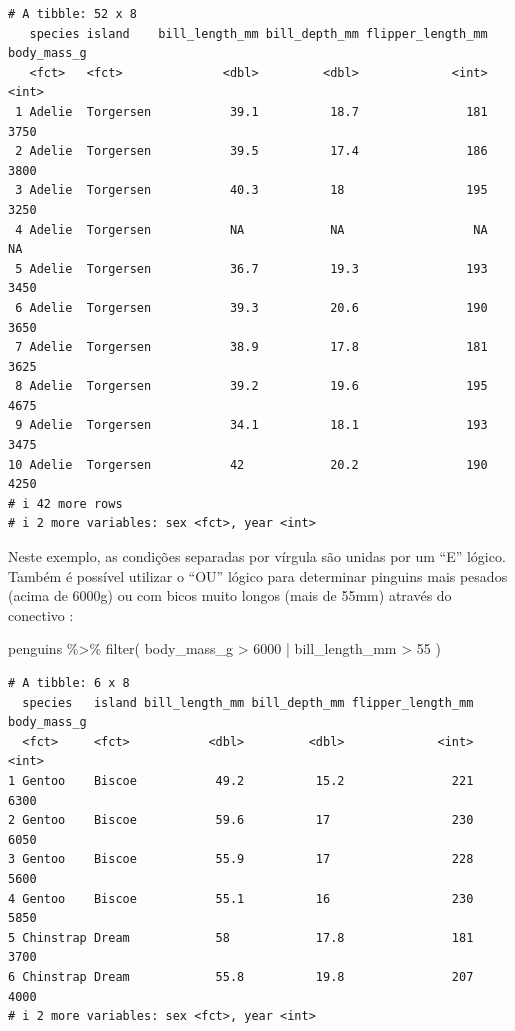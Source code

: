 \documentclass[
  12pt,
  letterpaper,
  DIV=11,
  numbers=noendperiod]{scrreprt}
\newenvironment{Shaded}{\begin{snugshade}}{\end{snugshade}}
\newcommand{\DecValTok}[1]{\textcolor[rgb]{0.68,0.00,0.00}{#1}}
\newcommand{\FunctionTok}[1]{\textcolor[rgb]{0.28,0.35,0.67}{#1}}
\newcommand{\NormalTok}[1]{\textcolor[rgb]{0.00,0.23,0.31}{#1}}
\newcommand{\SpecialCharTok}[1]{\textcolor[rgb]{0.37,0.37,0.37}{#1}}
\theoremstyle{definition}
\theoremstyle{exemplo}
\begin{document}
\begin{verbatim}
# A tibble: 52 x 8
   species island    bill_length_mm bill_depth_mm flipper_length_mm body_mass_g
   <fct>   <fct>              <dbl>         <dbl>             <int>       <int>
 1 Adelie  Torgersen           39.1          18.7               181        3750
 2 Adelie  Torgersen           39.5          17.4               186        3800
 3 Adelie  Torgersen           40.3          18                 195        3250
 4 Adelie  Torgersen           NA            NA                  NA          NA
 5 Adelie  Torgersen           36.7          19.3               193        3450
 6 Adelie  Torgersen           39.3          20.6               190        3650
 7 Adelie  Torgersen           38.9          17.8               181        3625
 8 Adelie  Torgersen           39.2          19.6               195        4675
 9 Adelie  Torgersen           34.1          18.1               193        3475
10 Adelie  Torgersen           42            20.2               190        4250
# i 42 more rows
# i 2 more variables: sex <fct>, year <int>
\end{verbatim}

Neste exemplo, as condições separadas por vírgula são unidas por um
``E'' lógico. Também é possível utilizar o ``OU'' lógico para determinar
pinguins mais pesados (acima de 6000g) ou com bicos muito longos (mais
de 55mm) através do conectivo \texttt{\textbar{}}:

\begin{Shaded}
\begin{Highlighting}[]
\NormalTok{penguins }\SpecialCharTok{\%\textgreater{}\%} 
  \FunctionTok{filter}\NormalTok{(}
\NormalTok{    body\_mass\_g }\SpecialCharTok{\textgreater{}} \DecValTok{6000} \SpecialCharTok{|}\NormalTok{ bill\_length\_mm }\SpecialCharTok{\textgreater{}} \DecValTok{55}
\NormalTok{  )}
\end{Highlighting}
\end{Shaded}

\begin{verbatim}
# A tibble: 6 x 8
  species   island bill_length_mm bill_depth_mm flipper_length_mm body_mass_g
  <fct>     <fct>           <dbl>         <dbl>             <int>       <int>
1 Gentoo    Biscoe           49.2          15.2               221        6300
2 Gentoo    Biscoe           59.6          17                 230        6050
3 Gentoo    Biscoe           55.9          17                 228        5600
4 Gentoo    Biscoe           55.1          16                 230        5850
5 Chinstrap Dream            58            17.8               181        3700
6 Chinstrap Dream            55.8          19.8               207        4000
# i 2 more variables: sex <fct>, year <int>
\end{verbatim}
\end{document}
